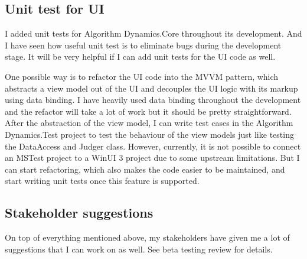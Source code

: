 \documentclass[report.tex]{subfiles}
\begin{document}
\subsection{Unit test for UI}

I added unit tests for Algorithm Dynamics.Core throughout its development. And I have seen how useful unit test is to eliminate bugs during the development stage. It will be very helpful if I can add unit tests for the UI code as well.

One possible way is to refactor the UI code into the MVVM\cite{microsoft:docs:mvvm-introduction} pattern, which abstracts a view model out of the UI and decouples the UI logic with its markup using data binding\cite{microsoft:docs:data-binding-and-mvvm}. I have heavily used data binding throughout the development and the refactor will take a lot of work but it should be pretty straightforward. After the abstraction of the view model, I can write test cases in the Algorithm Dynamics.Test project to test the behaviour of the view models just like testing the DataAccess and Judger class. However, currently, it is not possible to connect an MSTest project to a WinUI 3 project due to some upstream limitations\cite{github:microsoft-ui-xaml:6258}. But I can start refactoring, which also makes the code easier to be maintained, and start writing unit tests once this feature is supported.

\subsection{Stakeholder suggestions}

On top of everything mentioned above, my stakeholders have given me a lot of suggestions that I can work on as well. See beta testing review for details.
\end{document}
